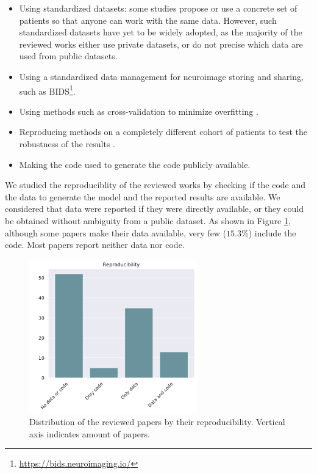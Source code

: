 \begin{itemize}\itemsep7pt
\item Using standardized datasets: some studies \cite{cuingnet,Moradi2015,Sanroma2017,Wyman2013} propose or use a concrete set of patients so that anyone can work with the same data. However, such standardized datasets have yet to be widely adopted, as the majority of the reviewed works either use private datasets, or do not precise which data are used from public datasets.

\item Using a standardized data management for neuroimage storing and sharing, such as BIDS\footnote{\url{https://bids.neuroimaging.io/}}. 

\item Using methods such as cross-validation to minimize overfitting \cite{Yang2018}.

\item Reproducing methods on a completely different cohort of patients to test the robustness of the results \cite{Casanova2018}.

\item Making the code used to generate the code publicly available.
\end{itemize}

We studied the reproduciblity of the reviewed works by checking if the code and the data to generate the model and the reported results are available. We considered that data were reported if they were directly available, or they could be obtained without ambiguity from a public dataset. As shown in Figure \ref{fig:reproduc}, although some papers make their data available, very few ($15.3 \%$) include the code. Most papers report neither data nor code.  \\

\begin{figure}[!htbp]
\centering
\includegraphics[width=0.65\textwidth]{figures/review/Fig10.pdf}
    \caption[Distribution of the reviewed papers by their reproducibility.]{Distribution of the reviewed papers by their reproducibility. Vertical axis indicates amount of papers.}
    \label{fig:reproduc}
\end{figure}

